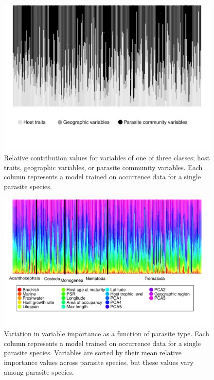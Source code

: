 \documentclass[12pt]{article}
\begin{document}
 
 \newpage
 \begin{figure}[h!]
  \includegraphics[width=\textwidth]{Figures/allDataColorGS.pdf}
  \caption{Relative contribution values for variables of one of three classes; host traits, geographic variables, or parasite community variables. Each column represents a model trained on occurrence data for a single parasite species.}
 \label{fig:allDataBar}
 \end{figure}

 
 
 \newpage
 \begin{figure}[h!]
  \includegraphics[width=\textwidth]{Figures/parTypeColor.pdf}
  \caption{Variation in variable importance as a function of parasite type. Each column represents a model trained on occurrence data for a single parasite species. Variables are sorted by their mean relative importance values across parasite species, but these values vary among parasite species.}
 \label{fig:parType}
 \end{figure}
\end{document}
